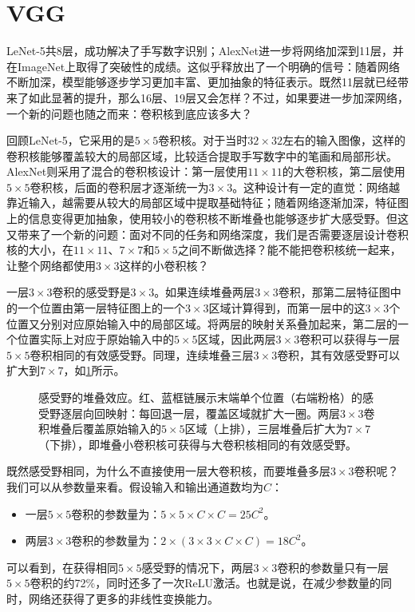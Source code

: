 \section{VGG}

LeNet-5共8层，成功解决了手写数字识别；AlexNet进一步将网络加深到11层，并在ImageNet上取得了突破性的成绩。这似乎释放出了一个明确的信号：随着网络不断加深，模型能够逐步学习更加丰富、更加抽象的特征表示。既然11层就已经带来了如此显著的提升，那么16层、19层又会怎样？不过，如果要进一步加深网络，一个新的问题也随之而来：卷积核到底应该多大？

回顾LeNet-5，它采用的是$5\times5$卷积核。对于当时$32\times32$左右的输入图像，这样的卷积核能够覆盖较大的局部区域，比较适合提取手写数字中的笔画和局部形状。AlexNet则采用了混合的卷积核设计：第一层使用$11\times11$的大卷积核，第二层使用$5\times5$卷积核，后面的卷积层才逐渐统一为$3\times3$。这种设计有一定的直觉：网络越靠近输入，越需要从较大的局部区域中提取基础特征；随着网络逐渐加深，特征图上的信息变得更加抽象，使用较小的卷积核不断堆叠也能够逐步扩大感受野。但这又带来了一个新的问题：面对不同的任务和网络深度，我们是否需要逐层设计卷积核的大小，在$11\times11$、$7\times7$和$5\times5$之间不断做选择？能不能把卷积核统一起来，让整个网络都使用$3\times3$这样的小卷积核？

一层$3\times3$卷积的感受野是$3\times3$。如果连续堆叠两层$3\times3$卷积，那第二层特征图中的一个位置由第一层特征图上的一个$3\times3$区域计算得到，而第一层中的这$3\times3$个位置又分别对应原始输入中的局部区域。将两层的映射关系叠加起来，第二层的一个位置实际上对应于原始输入中的$5\times5$区域，因此两层$3\times3$卷积可以获得与一层$5\times5$卷积相同的有效感受野。同理，连续堆叠三层$3\times3$卷积，其有效感受野可以扩大到$7\times7$，如\cref{fig:vgg_receptive_field}所示。

\begin{figure}[H]
    \caption{感受野的堆叠效应。红、蓝框链展示末端单个位置（右端粉格）的感受野逐层向回映射：每回退一层，覆盖区域就扩大一圈。两层$3\times 3$卷积堆叠后覆盖原始输入的$5\times 5$区域（上排），三层堆叠后扩大为$7\times 7$（下排），即堆叠小卷积核可获得与大卷积核相同的有效感受野。}
    \label{fig:vgg_receptive_field}
\end{figure}

既然感受野相同，为什么不直接使用一层大卷积核，而要堆叠多层$3\times3$卷积呢？我们可以从参数量来看。假设输入和输出通道数均为$C$：
\begin{itemize}
    \item 一层$5\times5$卷积的参数量为：$5\times5\times C\times C=25C^2$。
    \item 两层$3\times3$卷积的参数量为：$2\times(3\times3\times C\times C)=18C^2$。
\end{itemize}
可以看到，在获得相同$5\times5$感受野的情况下，两层$3\times3$卷积的参数量只有一层$5\times5$卷积的约72\%，同时还多了一次ReLU激活。也就是说，在减少参数量的同时，网络还获得了更多的非线性变换能力。

